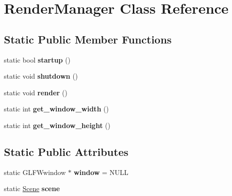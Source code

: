 \hypertarget{class_render_manager}{}\section{Render\+Manager Class Reference}
\label{class_render_manager}
\subsection*{Static Public Member Functions}
\begin{DoxyCompactItemize}
\item 
\hypertarget{class_render_manager_acb6579b0b9499bc350d5ce61034de81c}{}static bool {\bfseries startup} ()\label{class_render_manager_acb6579b0b9499bc350d5ce61034de81c}

\item 
\hypertarget{class_render_manager_a781a6424debdf00aad728b6a532f1330}{}static void {\bfseries shutdown} ()\label{class_render_manager_a781a6424debdf00aad728b6a532f1330}

\item 
\hypertarget{class_render_manager_a973a0659a04006fd7e4215e8af288bd7}{}static void {\bfseries render} ()\label{class_render_manager_a973a0659a04006fd7e4215e8af288bd7}

\item 
\hypertarget{class_render_manager_a371906214861b8f8486c02fb70070771}{}static int {\bfseries get\+\_\+window\+\_\+width} ()\label{class_render_manager_a371906214861b8f8486c02fb70070771}

\item 
\hypertarget{class_render_manager_a141921ade44407792728ccd046519f44}{}static int {\bfseries get\+\_\+window\+\_\+height} ()\label{class_render_manager_a141921ade44407792728ccd046519f44}

\end{DoxyCompactItemize}
\subsection*{Static Public Attributes}
\begin{DoxyCompactItemize}
\item 
\hypertarget{class_render_manager_a2277e91d3aae3d3444da448fe56fe27a}{}static G\+L\+F\+Wwindow $\ast$ {\bfseries window} = N\+U\+L\+L\label{class_render_manager_a2277e91d3aae3d3444da448fe56fe27a}

\item 
\hypertarget{class_render_manager_a3952872dd003936679540eb670ebafeb}{}static \hyperlink{class_scene}{Scene} {\bfseries scene}\label{class_render_manager_a3952872dd003936679540eb670ebafeb}

\end{DoxyCompactItemize}
